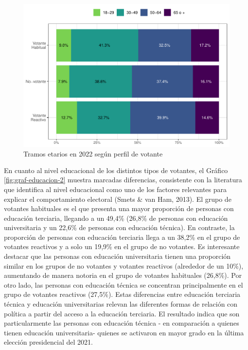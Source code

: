 \documentclass[
  12pt,
]{book}
\begin{document}
\begin{figure}

{\centering \includegraphics{reporte-elsoc_files/figure-latex/graf-edad-2-1} 

}

\caption{Tramos etarios en 2022 según perfil de votante}\label{fig:graf-edad-2}
\end{figure}

En cuanto al nivel educacional de los distintos tipos de votantes, el Gráfico \ref{fig:graf-educacion-2} muestra marcadas diferencias, consistente con la literatura que identifica al nivel educacional como uno de los factores relevantes para explicar el comportamiento electoral (Smets \& van Ham, 2013). El grupo de votantes habituales es el que presenta una mayor proporción de personas con educación terciaria, llegando a un 49,4\% (26,8\% de personas con educación universitaria y un 22,6\% de personas con educación técnica). En contraste, la proporción de personas con educación terciaria llega a un 38,2\% en el grupo de votantes reactivos y a solo un 19,9\% en el grupo de no votantes. Es interesante destacar que las personas con educación universitaria tienen una proporción similar en los grupos de no votantes y votantes reactivos (alrededor de un 10\%), aumentando de manera notoria en el grupo de votantes habituales (26,8\%). Por otro lado, las personas con educación técnica se concentran principalmente en el grupo de votantes reactivos (27,5\%). Estas diferencias entre educación terciaria técnica y educación universitarias relevan las diferentes formas de relación con política a partir del acceso a la educación terciaria. El resultado indica que son particularmente las personas con educación técnica - en comparación a quienes tienen educación universitaria- quienes se activaron en mayor grado en la última elección presidencial del 2021.
\end{document}
